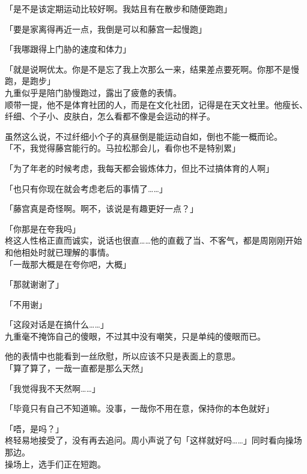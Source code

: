 「是不是该定期运动比较好啊。我姑且有在散步和随便跑跑」

「要是家离得再近一点，我倒是可以和藤宫一起慢跑」

「我哪跟得上门胁的速度和体力」

「就是说啊优太。你是不是忘了我上次那么一来，结果差点要死啊。你那不是慢跑，是跑步」\\

九重似乎是陪门胁慢跑过，露出了疲惫的表情。\\

顺带一提，他不是体育社团的人，而是在文化社团，记得是在天文社里。他瘦长、纤细、个子小、皮肤白，怎么看都不像是会运动的样子。

虽然这么说，不过纤细小个子的真昼倒是能运动自如，倒也不能一概而论。\\

「不，我觉得藤宫能行的。马拉松那会儿，看你也不是特别累」

「为了年老的时候考虑，我每天都会锻炼体力，但比不过搞体育的人啊」

「也只有你现在就会考虑老后的事情了……」

「藤宫真是奇怪啊。啊不，该说是有趣更好一点？」

「你那是在夸我吗」\\

柊这人性格正直而诚实，说话也很直……他的直截了当、不客气，都是周刚刚开始和他相处时就已理解的事情。\\

「一哉那大概是在夸你吧，大概」

「那就谢谢了」

「不用谢」

「这段对话是在搞什么……」\\

九重毫不掩饰自己的傻眼，不过其中没有嘲笑，只是单纯的傻眼而已。

他的表情中也能看到一丝欣慰，所以应该不只是表面上的意思。\\

「算了算了，一哉一直都是那么天然」

「我觉得我不天然啊……」

「毕竟只有自己不知道嘛。没事，一哉你不用在意，保持你的本色就好」

「唔，是吗？」\\

柊轻易地接受了，没有再去追问。周小声说了句「这样就好吗……」同时看向操场那边。\\

操场上，选手们正在短跑。\\

